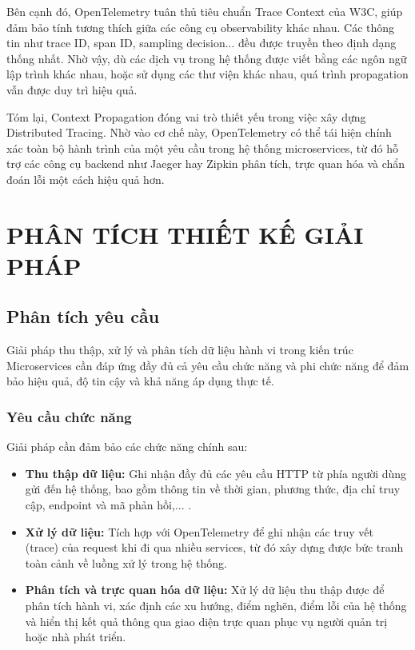 \documentclass{uetgraduation}
\begin{document}
Bên cạnh đó, OpenTelemetry tuân thủ tiêu chuẩn Trace Context của W3C, giúp đảm bảo tính tương thích giữa các công cụ observability khác nhau. Các thông tin như trace ID, span ID, sampling decision... đều được truyền theo định dạng thống nhất. Nhờ vậy, dù các dịch vụ trong hệ thống được viết bằng các ngôn ngữ lập trình khác nhau, hoặc sử dụng các thư viện khác nhau, quá trình propagation vẫn được duy trì hiệu quả.

Tóm lại, Context Propagation đóng vai trò thiết yếu trong việc xây dựng Distributed Tracing. Nhờ vào cơ chế này, OpenTelemetry có thể tái hiện chính xác toàn bộ hành trình của một yêu cầu trong hệ thống microservices, từ đó hỗ trợ các công cụ backend như Jaeger hay Zipkin phân tích, trực quan hóa và chẩn đoán lỗi một cách hiệu quả hơn.

    \chapter{PHÂN TÍCH THIẾT KẾ GIẢI PHÁP}
    \section{Phân tích yêu cầu}
    Giải pháp thu thập, xử lý và phân tích dữ liệu hành vi trong kiến trúc Microservices cần đáp ứng đầy đủ cả yêu cầu chức năng và phi chức năng để đảm bảo hiệu quả, độ tin cậy và khả năng áp dụng thực tế.

\subsection{Yêu cầu chức năng}
Giải pháp cần đảm bảo các chức năng chính sau:
\begin{itemize}
    \item \textbf{Thu thập dữ liệu:} Ghi nhận đầy đủ các yêu cầu HTTP từ phía người dùng gửi đến hệ thống, bao gồm thông tin về thời gian, phương thức, địa chỉ truy cập, endpoint và mã phản hồi,... .
    \item \textbf{Xử lý dữ liệu:} Tích hợp với OpenTelemetry để ghi nhận các truy vết (trace) của request khi đi qua nhiều services, từ đó xây dựng được bức tranh toàn cảnh về luồng xử lý trong hệ thống.
    \item \textbf{Phân tích và trực quan hóa dữ liệu:} Xử lý dữ liệu thu thập được để phân tích hành vi, xác định các xu hướng, điểm nghẽn, điểm lỗi của hệ thống và hiển thị kết quả thông qua giao diện trực quan phục vụ người quản trị hoặc nhà phát triển.
\end{itemize}
\end{document}
